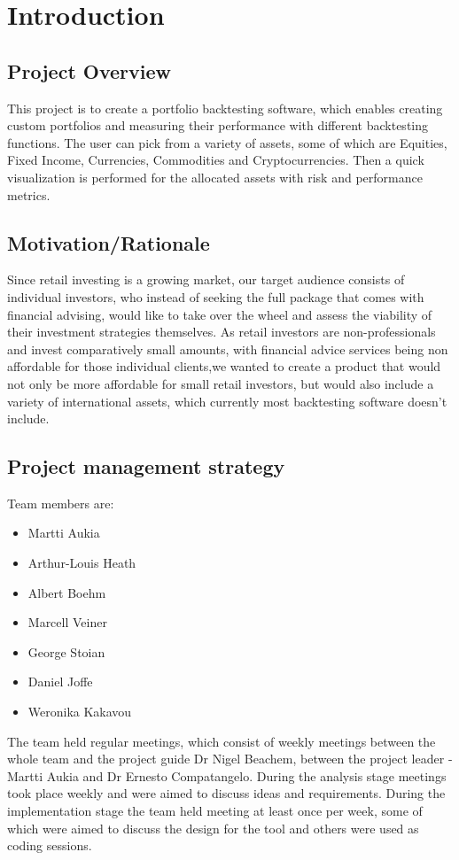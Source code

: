 \documentclass[main.tex]{subfiles}
\begin{document}
\section{Introduction}
\subsection {Project Overview}

This project is to create a portfolio backtesting software, which enables creating custom portfolios and measuring their performance with different backtesting functions. The user can pick from a variety of assets, some of which are Equities, Fixed Income, Currencies, Commodities and Cryptocurrencies. Then a quick visualization is performed for the allocated assets with risk and performance metrics.
\subsection{Motivation/Rationale}
Since retail investing is a growing market, our target audience consists of individual investors, who instead of seeking the full package that comes with financial advising, would like to take over the wheel and assess the viability of their investment strategies themselves. As retail investors are non-professionals and invest comparatively small amounts, with financial advice services being non affordable for those individual clients,we wanted to create a product that would not only be more affordable for small retail investors, but would also include a variety of international assets, which currently most backtesting software doesn't include.

\subsection{Project management strategy}

Team members are:
\begin{itemize}
    \item Martti Aukia
    \item Arthur-Louis Heath
	\item Albert Boehm
	\item Marcell Veiner
	\item George Stoian
	\item Daniel Joffe
	\item Weronika Kakavou

\end{itemize}


The team held regular meetings, which consist of weekly meetings between the whole team and the project guide Dr Nigel Beachem, between the project leader - Martti Aukia and Dr Ernesto Compatangelo. During the analysis stage meetings took place weekly and were aimed to discuss ideas and requirements. During the implementation stage the team held meeting at least once per week, some of which were aimed to discuss the design for the tool and others were used as coding sessions.
\end{document}

